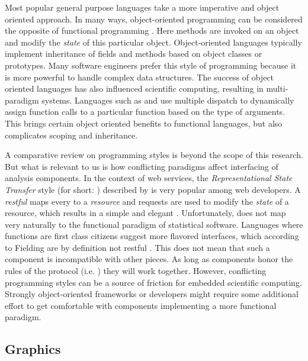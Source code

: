 Most popular general purpose languages take a more imperative and object oriented approach. In many ways, object-oriented programming can be considered the opposite of functional programming \citep{pythonfunctional}. Here methods are invoked on an object and modify the \emph{state} of this particular object. Object-oriented languages typically implement inheritance of fields and methods based on object classes or prototypes. Many software engineers prefer this style of programming because it is more powerful to handle complex data structures. The success of object oriented languages has also influenced scientific computing, resulting in multi-paradigm systems. Languages such as \Julia and \R use multiple dispatch to dynamically assign function calls to a particular function based on the type of arguments. This brings certain object oriented benefits to functional languages, but also complicates scoping and inheritance. 

A comparative review on programming styles is beyond the scope of this research. But what is relevant to us is how conflicting paradigms affect interfacing of analysis components. In the context of web services, the \emph{Representational State Transfer} style (for short: \REST) described by \cite{fielding2000architectural} is very popular among web developers. A \emph{restful} \API maps every \URL to a \emph{resource} and \HTTP requests are used to modify the \emph{state} of a resource, which results in a simple and elegant \API. Unfortunately, \REST does not map very naturally to the functional paradigm of statistical software. Languages where functions are first class citizens suggest more \RPC flavored interfaces, which according to Fielding are by definition not restful \citep{fielding2008rest}. This does not mean that such a component is incompatible with other pieces. As long as components honor the rules of the protocol (i.e. \HTTP) they will work together. However, conflicting programming styles can be a source of friction for embedded scientific computing. Strongly object-oriented frameworks or developers might require some additional effort to get comfortable with components implementing a more functional paradigm.



\subsection{Graphics}


